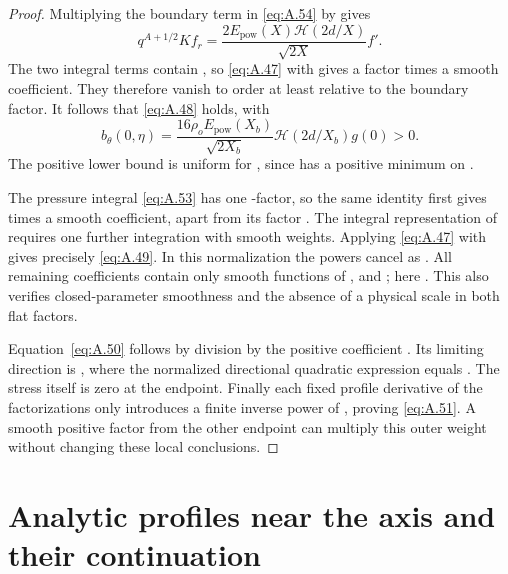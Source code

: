 \begin{proof}
Multiplying the boundary term in \eqref{eq:A.54} by  gives
\[
  q^{A+1/2}Kf_r=\frac{2E_{\mathrm{pow}}(X)\mathcal H(2d/X)}{\sqrt{2X}}f'.
\]
The two integral terms contain , so \eqref{eq:A.47} with
 gives a factor  times a smooth coefficient. They therefore
vanish to order at least  relative to the boundary factor. It follows that \eqref{eq:A.48} holds,
with
\[
  b_\theta(0,\eta)=\frac{16\rho_oE_{\mathrm{pow}}(X_b)}{\sqrt{2X_b}}
  \mathcal H(2d/X_b)g(0)>0.
\]
The positive lower bound is uniform for , since  has a
positive minimum on .

The pressure integral \eqref{eq:A.53} has one -factor, so the same identity first gives
 times a smooth coefficient, apart from its factor
. The integral representation of  requires one further integration with
smooth weights. Applying \eqref{eq:A.47} with  gives precisely \eqref{eq:A.49}. In this normalization
the powers cancel as
. All remaining coefficients contain only smooth functions of
, and ; here
. This also verifies closed-parameter smoothness and the absence of a physical scale in both
flat factors.

%
Equation~\eqref{eq:A.50} follows by division by the positive coefficient . Its limiting direction
is , where the normalized directional quadratic expression equals . The
stress itself is zero at the endpoint. Finally each fixed profile derivative of the factorizations only introduces a finite
inverse power of , proving \eqref{eq:A.51}. A smooth positive factor from the other endpoint can
multiply this outer weight without changing these local conclusions.
\end{proof}

\section{Analytic profiles near the axis and their continuation}\label{sec:B}

